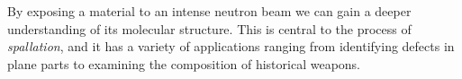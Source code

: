 By exposing a material to an intense neutron beam we can gain a deeper understanding of its molecular structure. This is central to the process of \textit{spallation}, and it has a variety of applications ranging from identifying defects in plane parts to examining the composition of historical weapons. 

